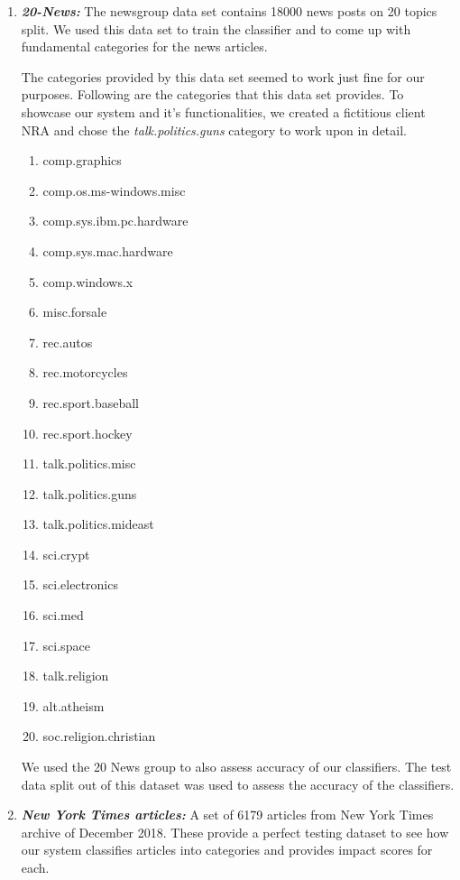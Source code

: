 \documentclass[paper=a4, fontsize=11pt]{scrartcl}
\numberwithin{equation}{section}		%
\numberwithin{figure}{section}			%
\numberwithin{table}{section}				%
\begin{document}
\begin {enumerate}

\item \textbf{\textit{20-News:} }
The newsgroup data set contains 18000 news posts on 20 topics split. We used this data set to train the classifier and to come up with fundamental categories for the news articles.

The categories provided by this data set seemed to work just fine for our purposes. Following are the categories that this data set provides. To showcase our system and it's functionalities, we created a fictitious client NRA and chose the \textit{talk.politics.guns} category to work upon in detail.

\begin {enumerate}
\item {comp.graphics}
\item {comp.os.ms-windows.misc}
\item {comp.sys.ibm.pc.hardware}
\item {comp.sys.mac.hardware}
\item {comp.windows.x}
\item {misc.forsale}
\item {rec.autos}
\item {rec.motorcycles}
\item {rec.sport.baseball}
\item {rec.sport.hockey}
\item {talk.politics.misc}
\item {talk.politics.guns}
\item { talk.politics.mideast}
\item {sci.crypt}
\item {sci.electronics}
\item {sci.med}
\item {sci.space}
\item {talk.religion}
\item {alt.atheism}
\item {soc.religion.christian}
\end {enumerate}

We used the 20 News group to also assess accuracy of our classifiers. The test data split out of this dataset was used to assess the accuracy of the classifiers.

\item \textbf{\textit{New York Times articles:}}
A set of 6179 articles from New York Times archive of December 2018. These provide a perfect testing dataset to see how our system classifies articles into categories and provides impact scores for each.

\end {enumerate}
\end{document}
